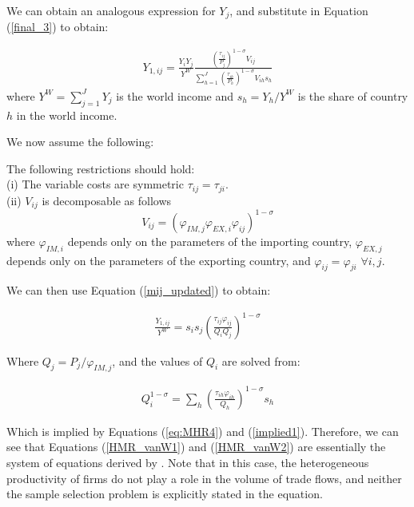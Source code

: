 We can obtain an analogous expression for $Y_{j}$, and substitute in Equation (\ref{final_3}) to obtain:

\begin{align} \label{mij_updated}
    Y_{1,i j}=\frac{Y_{i} Y_{j}}{Y^W} \frac{\left(\frac{\tau_{i j}}{P_{j}}\right)^{1-\sigma} V_{i j}}{\sum_{h=1}^{J}\left(\frac{\tau_{i h}}{P_{h}}\right)^{1-\sigma} V_{i h} s_{h}}
\end{align}
where $Y^W = \sum_{j=1}^J Y_j$ is the world income and $s_h = Y_h/Y^W$ is the share of country $h$ in the world income.

We now assume the following:

\begin{assumption} The following restrictions should hold:\\
    (i) The variable costs are symmetric $\tau_{ij} = \tau_{ji}$.\\
    (ii) $V_{ij}$ is decomposable as follows
        $$ V_{ij} = \left(\varphi_{I M, j} \varphi_{E X, i} \varphi_{i j}\right)^{1-\sigma} $$
        where $\varphi_{I M, i}$ depends only on the parameters of the importing country, $\varphi_{E X, j}$ depends only on the parameters of the exporting country, and $\varphi_{i j} = \varphi_{j i}$ $\forall i,j$.
\end{assumption}

We can then use Equation (\ref{mij_updated}) to obtain:

\begin{align} \label{HMR_vanW1}
    \frac{Y_{1,i j}}{Y^W}=s_{i} s_{j}\left(\frac{\tau_{i j} \varphi_{i j}}{Q_{i} Q_{j}}\right)^{1-\sigma}
\end{align}

Where $Q_j = P_j / \varphi_{IM, j}$, and the values of $Q_i$ are solved from:

\begin{align} \label{HMR_vanW2}
    Q_{i}^{1-\sigma}=\sum_{h}\left(\frac{\tau_{i h} \varphi_{i h}}{Q_{h}}\right)^{1-\sigma} s_{h}
\end{align}

Which is implied by Equations (\ref{eq:MHR4}) and (\ref{implied1}).
Therefore, we can see that Equations (\ref{HMR_vanW1}) and (\ref{HMR_vanW2}) are essentially the system of equations derived by \cite{anderson2003gravity}. Note that in this case, the heterogeneous productivity of firms do not play a role in the volume of trade flows, and neither the sample selection problem is explicitly stated in the equation.

